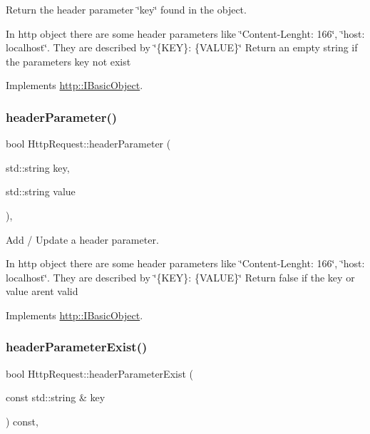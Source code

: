 Return the header parameter \char`\"{}key\char`\"{} found in the object. 

In http object there are some header parameters like \char`\"{}\+Content-\/\+Lenght\+: 166\char`\"{}, \char`\"{}host\+: localhost\char`\"{}. They are described by \char`\"{}\{\+K\+E\+Y\}\+: \{\+V\+A\+L\+U\+E\}\char`\"{} Return an empty string if the parameters key not exist 

Implements \hyperlink{structhttp_1_1IBasicObject_a17f97dd4917fdd7dd694d3d191eaebca}{http\+::\+I\+Basic\+Object}.

\mbox{\label{classHttpRequest_a04f974104da7c06c568a8e648693e92c}} 
\subsubsection{\texorpdfstring{header\+Parameter()}{headerParameter()}\hspace{0.1cm}{\footnotesize\ttfamily [2/2]}}
{\footnotesize\ttfamily bool Http\+Request\+::header\+Parameter (\begin{DoxyParamCaption}\item[{std\+::string}]{key,  }\item[{std\+::string}]{value }\end{DoxyParamCaption})\hspace{0.3cm}{\ttfamily [virtual]}, {\ttfamily [noexcept]}}



Add / Update a header parameter. 

In http object there are some header parameters like \char`\"{}\+Content-\/\+Lenght\+: 166\char`\"{}, \char`\"{}host\+: localhost\char`\"{}. They are described by \char`\"{}\{\+K\+E\+Y\}\+: \{\+V\+A\+L\+U\+E\}\char`\"{} Return false if the key or value aren\textquotesingle{}t valid 

Implements \hyperlink{structhttp_1_1IBasicObject_a0d1fff270c6069bedf87e86cdac6bf3d}{http\+::\+I\+Basic\+Object}.

\mbox{\label{classHttpRequest_a74ea75d8685647989346bd5d1d25702a}} 
\subsubsection{\texorpdfstring{header\+Parameter\+Exist()}{headerParameterExist()}}
{\footnotesize\ttfamily bool Http\+Request\+::header\+Parameter\+Exist (\begin{DoxyParamCaption}\item[{const std\+::string \&}]{key }\end{DoxyParamCaption}) const\hspace{0.3cm}{\ttfamily [virtual]}, {\ttfamily [noexcept]}}



